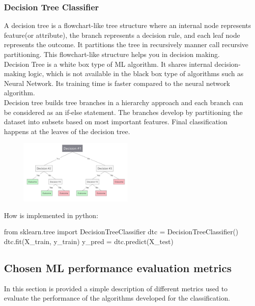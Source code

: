 \documentclass{article}
\begin{document}
\newpage
\subsubsection*{Decision Tree Classifier}
\begin{multicols}{2}
A decision tree is a flowchart-like tree structure where an internal node represents feature(or attribute), the branch represents a decision rule, and each leaf node represents the outcome. It partitions the tree in recursively manner call recursive partitioning. This flowchart-like structure helps you in decision making.\\Decision Tree is a white box type of ML algorithm. It shares internal decision-making logic, which is not available in the black box type of algorithms such as Neural Network. Its training time is faster compared to the neural network algorithm.\\ Decision tree builds tree branches in a hierarchy approach and each branch can be considered as an if-else statement. The branches develop by partitioning the dataset into subsets based on most important features. Final classification happens at the leaves of the decision tree.
 \columnbreak
\begin{figure}[H]
        \begin{center}
        \includegraphics[width=0.5\textwidth]{DecTree.png}
        \end{center}
    \end{figure} 
\end{multicols}
\begin{center}
    How is implemented in python:
\begin{Python}
from sklearn.tree import DecisionTreeClassifier
dtc = DecisionTreeClassifier()
dtc.fit(X_train, y_train)
y_pred = dtc.predict(X_test)
\end{Python}
\end{center}


\subsection{Chosen ML performance evaluation metrics} \label{sec:performances}
In this section is provided a simple description of different metrics used to evaluate the performance of the algorithms developed for the classification. 
\end{document}
